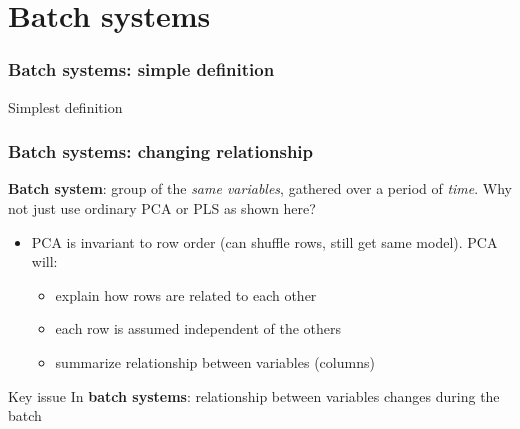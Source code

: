 \documentclass[handout, 12pt]{beamer}
\begin{document}
\section{Batch systems}

\begin{frame}\frametitle{Batch systems: simple definition}

\begin{exampleblock}{Simplest definition}
\end{exampleblock}
	

\end{frame}	

\begin{frame}\frametitle{Batch systems: changing relationship}

\textbf{Batch system}: group of the \emph{same variables}, gathered over a period of \emph{time}.  Why not just use ordinary PCA or PLS as shown here?


\begin{itemize}
	\item 	PCA is invariant to row order (can shuffle rows, still get same model).  PCA will:
	\begin{itemize}
		\item 	explain how rows are related to each other
		\item 	each row is assumed independent of the others
		\item 	summarize relationship between variables (columns)
	\end{itemize}
\end{itemize}

\begin{exampleblock}{Key issue}
In \textbf{batch systems}: relationship between variables \alert{changes during the batch}
\end{exampleblock}
\end{frame}
\end{document}
